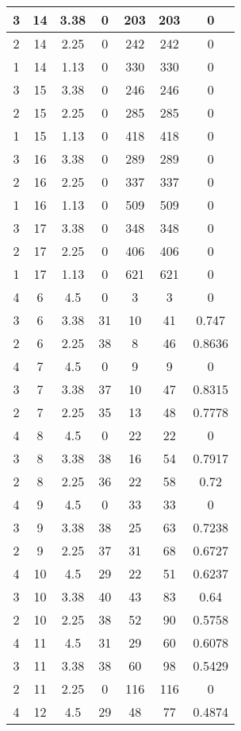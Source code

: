 \documentclass[letterpaper, 12pt]{article}
\begin{document}
\begin{longtable}{|c|c|c|c|c|c|c|}
\hline
3 & 14 & 3.38 & 0 & 203 & 203 & 0 \\
\hline
2 & 14 & 2.25 & 0 & 242 & 242 & 0 \\
\hline
1 & 14 & 1.13 & 0 & 330 & 330 & 0 \\
\hline
3 & 15 & 3.38 & 0 & 246 & 246 & 0 \\
\hline
2 & 15 & 2.25 & 0 & 285 & 285 & 0 \\
\hline
1 & 15 & 1.13 & 0 & 418 & 418 & 0 \\
\hline
3 & 16 & 3.38 & 0 & 289 & 289 & 0 \\
\hline
2 & 16 & 2.25 & 0 & 337 & 337 & 0 \\
\hline
1 & 16 & 1.13 & 0 & 509 & 509 & 0 \\
\hline
3 & 17 & 3.38 & 0 & 348 & 348 & 0 \\
\hline
2 & 17 & 2.25 & 0 & 406 & 406 & 0 \\
\hline
1 & 17 & 1.13 & 0 & 621 & 621 & 0 \\
\hline
4 & 6 & 4.5 & 0 & 3 & 3 & 0 \\
\hline
3 & 6 & 3.38 & 31 & 10 & 41 & 0.747 \\
\hline
2 & 6 & 2.25 & 38 & 8 & 46 & 0.8636 \\
\hline
4 & 7 & 4.5 & 0 & 9 & 9 & 0 \\
\hline
3 & 7 & 3.38 & 37 & 10 & 47 & 0.8315 \\
\hline
2 & 7 & 2.25 & 35 & 13 & 48 & 0.7778 \\
\hline
4 & 8 & 4.5 & 0 & 22 & 22 & 0 \\
\hline
3 & 8 & 3.38 & 38 & 16 & 54 & 0.7917 \\
\hline
2 & 8 & 2.25 & 36 & 22 & 58 & 0.72 \\
\hline
4 & 9 & 4.5 & 0 & 33 & 33 & 0 \\
\hline
3 & 9 & 3.38 & 38 & 25 & 63 & 0.7238 \\
\hline
2 & 9 & 2.25 & 37 & 31 & 68 & 0.6727 \\
\hline
4 & 10 & 4.5 & 29 & 22 & 51 & 0.6237 \\
\hline
3 & 10 & 3.38 & 40 & 43 & 83 & 0.64 \\
\hline
2 & 10 & 2.25 & 38 & 52 & 90 & 0.5758 \\
\hline
4 & 11 & 4.5 & 31 & 29 & 60 & 0.6078 \\
\hline
3 & 11 & 3.38 & 38 & 60 & 98 & 0.5429 \\
\hline
2 & 11 & 2.25 & 0 & 116 & 116 & 0 \\
\hline
4 & 12 & 4.5 & 29 & 48 & 77 & 0.4874 \\

\end{longtable}
\end{document}
